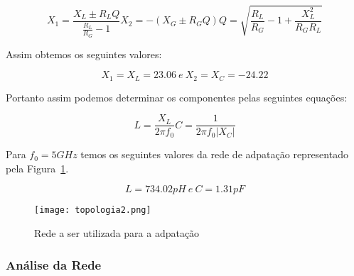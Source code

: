 \documentclass[a4paper,12pt]{proc}
\begin{document}
\begin{subequations}
    \label{eqn3}
    \begin{equation}
        \label{eqn3:1}
        X_{1} = \frac{X_{L}\pm R_{L}Q}{\frac{R_{L}}{R_{G}}-1} 
    \end{equation}

    \begin{equation}
        \label{eqn3:2}
        X_{2} = -(X_{G}\pm R_{G}Q)
    \end{equation}

    \begin{equation}
        \label{eqn3:3}
        Q = \sqrt{\frac{R_{L}}{R_{G}}-1+\frac{X_{L}^{2}}{R_{G}R_{L}}}
    \end{equation}

\end{subequations}

\singlespacing

\noindent Assim obtemos os seguintes valores:

\[X_{1} = X_{L} = 23.06 ~e~ X_{2} = X_{C} = -24.22\]

\noindent Portanto assim podemos determinar os componentes pelas seguintes equações:

\begin{subequations}
    \label{eqn4}
    \begin{equation}
        \label{eqn4:1}
        L = \frac{X_{L}}{2\pi f_{0}} 
    \end{equation}

    \begin{equation}
        \label{eqn4:2}
        C = \frac{1}{2\pi f_{0}\left\lvert X_{C}\right\rvert}
    \end{equation}

\end{subequations}

\noindent Para $f_{0} = 5 GHz$ temos os seguintes valores da rede de adpatação representado pela Figura~\ref{topo2}.

\[L = 734.02pH ~e~ C = 1.31pF \]

\begin{figure}[htbp]
    \centering
    \texttt{[image: topologia2.png]}
    \caption{Rede a ser utilizada para a adpatação}
    \label{topo2}
\end{figure}

\subsubsection{Análise da Rede}
\end{document}
